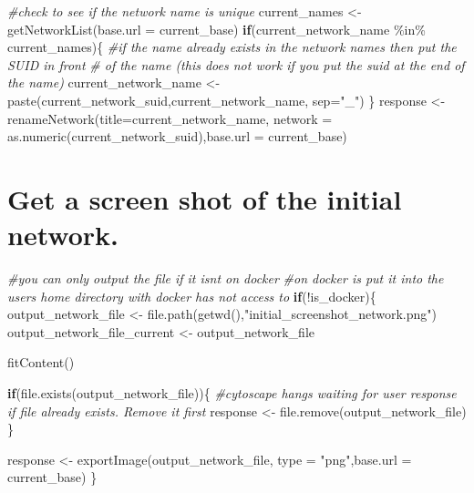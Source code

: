 \documentclass[
]{book}
\newenvironment{Shaded}{\begin{snugshade}}{\end{snugshade}}
\newcommand{\AttributeTok}[1]{\textcolor[rgb]{0.77,0.63,0.00}{#1}}
\newcommand{\CommentTok}[1]{\textcolor[rgb]{0.56,0.35,0.01}{\textit{#1}}}
\newcommand{\ControlFlowTok}[1]{\textcolor[rgb]{0.13,0.29,0.53}{\textbf{#1}}}
\newcommand{\FunctionTok}[1]{\textcolor[rgb]{0.00,0.00,0.00}{#1}}
\newcommand{\NormalTok}[1]{#1}
\newcommand{\OtherTok}[1]{\textcolor[rgb]{0.56,0.35,0.01}{#1}}
\newcommand{\SpecialCharTok}[1]{\textcolor[rgb]{0.00,0.00,0.00}{#1}}
\newcommand{\StringTok}[1]{\textcolor[rgb]{0.31,0.60,0.02}{#1}}
\begin{document}
\begin{Shaded}
\begin{Highlighting}[]
\CommentTok{\#check to see if the network name is unique}
\NormalTok{current\_names }\OtherTok{\textless{}{-}} \FunctionTok{getNetworkList}\NormalTok{(}\AttributeTok{base.url =}\NormalTok{ current\_base)}
\ControlFlowTok{if}\NormalTok{(current\_network\_name }\SpecialCharTok{\%in\%}\NormalTok{ current\_names)\{}
  \CommentTok{\#if the name already exists in the network names then put the SUID in front}
  \CommentTok{\# of the name (this does not work if you put the suid at the end of the name)}
\NormalTok{  current\_network\_name }\OtherTok{\textless{}{-}} \FunctionTok{paste}\NormalTok{(current\_network\_suid,current\_network\_name,  }\AttributeTok{sep=}\StringTok{"\_"}\NormalTok{)}
\NormalTok{\}}
\NormalTok{response }\OtherTok{\textless{}{-}} \FunctionTok{renameNetwork}\NormalTok{(}\AttributeTok{title=}\NormalTok{current\_network\_name, }
                       \AttributeTok{network =} \FunctionTok{as.numeric}\NormalTok{(current\_network\_suid),}\AttributeTok{base.url =}\NormalTok{ current\_base)}
\end{Highlighting}
\end{Shaded}

\hypertarget{get-a-screen-shot-of-the-initial-network.}{%
\section{Get a screen shot of the initial network.}\label{get-a-screen-shot-of-the-initial-network.}}

\begin{Shaded}
\begin{Highlighting}[]
\CommentTok{\#you can only output the file if it isn\textquotesingle{}t on docker}
\CommentTok{\#on docker is put it into the user\textquotesingle{}s home directory with docker has not access to}
\ControlFlowTok{if}\NormalTok{(}\SpecialCharTok{!}\NormalTok{is\_docker)\{}
\NormalTok{  output\_network\_file }\OtherTok{\textless{}{-}} \FunctionTok{file.path}\NormalTok{(}\FunctionTok{getwd}\NormalTok{(),}\StringTok{"initial\_screenshot\_network.png"}\NormalTok{)}
\NormalTok{  output\_network\_file\_current }\OtherTok{\textless{}{-}}\NormalTok{ output\_network\_file}

  \FunctionTok{fitContent}\NormalTok{()}

  \ControlFlowTok{if}\NormalTok{(}\FunctionTok{file.exists}\NormalTok{(output\_network\_file))\{}
    \CommentTok{\#cytoscape hangs waiting for user response if file already exists.  Remove it first}
\NormalTok{    response }\OtherTok{\textless{}{-}} \FunctionTok{file.remove}\NormalTok{(output\_network\_file)}
\NormalTok{  \} }

\NormalTok{  response }\OtherTok{\textless{}{-}} \FunctionTok{exportImage}\NormalTok{(output\_network\_file, }\AttributeTok{type =} \StringTok{"png"}\NormalTok{,}\AttributeTok{base.url =}\NormalTok{ current\_base)}
\NormalTok{\}}
\end{Highlighting}
\end{Shaded}
\end{document}
